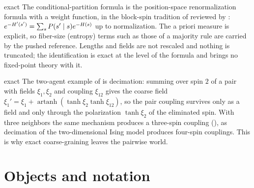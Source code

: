 \begin{analogy}{exact}
The conditional-partition formula is the position-space renormalization formula with a weight
function, in the block-spin tradition of \citet{kadanoff1966scaling} reviewed by
\citet{wilson1974renormalization}: $e^{-H'(s')}=\sum_sP(s'\mid s)e^{-H(s)}$ up to normalization.
The a priori measure is explicit, so fiber-size (entropy) terms such as those of a majority rule are
carried by the pushed reference. Lengths and fields are not rescaled and nothing is truncated; the
identification is exact at the level of the formula and brings no fixed-point theory with it.
\end{analogy}

\begin{analogy}{exact}
The two-agent example of  is decimation: summing over spin $2$ of a
pair with fields $\xi_1,\xi_2$ and coupling $\xi_{12}$ gives the coarse field
$\xi_1'=\xi_1+\operatorname{artanh}(\tanh\xi_2\tanh\xi_{12})$, so the pair coupling survives only as a
field and only through the polarization $\tanh\xi_2$ of the eliminated spin. With three neighbors the
same mechanism produces a three-spin coupling (), as decimation of
the two-dimensional Ising model produces four-spin couplings. This is why exact coarse-graining
leaves the pairwise world.
\end{analogy}

\section{Objects and notation}
\label{comp:ch11-notation}

